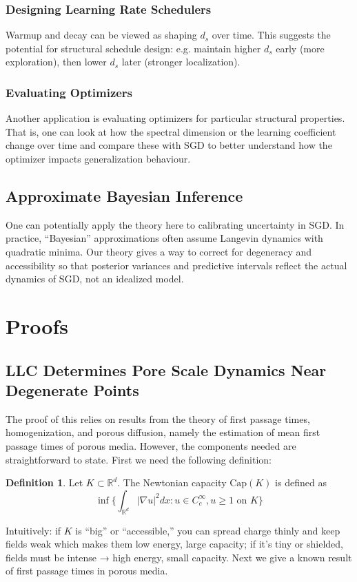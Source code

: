 \documentclass{article} %
\theoremstyle{definition}
\newtheorem{definition}{Definition}[section]
\begin{document}
\subsubsection{Designing Learning Rate Schedulers}
Warmup and decay can be viewed as shaping $d_s$ over time. This suggests the potential for structural schedule design: e.g. maintain higher $d_s$ early (more exploration), then lower $d_s$ later (stronger localization).

\subsubsection{Evaluating Optimizers}
Another application is evaluating optimizers for particular structural properties. That is, one can look at how the spectral dimension or the learning coefficient change over time and compare these with SGD to better understand how the optimizer impacts generalization behaviour.

\subsection{Approximate Bayesian Inference}
One can potentially apply the theory here to calibrating uncertainty in SGD. In practice, “Bayesian” approximations often assume Langevin dynamics with quadratic minima. Our theory gives a way to correct for degeneracy and accessibility so that posterior variances and predictive intervals reflect the actual dynamics of SGD, not an idealized model.


\section{Proofs}\label{app:proofs}
\subsection{LLC Determines Pore Scale Dynamics Near Degenerate Points}
The proof of this relies on results from the theory of first passage times, homogenization, and porous diffusion, namely the estimation of mean first passage times of porous media. However, the components needed are straightforward to state. First we need the following definition\citep{potential_theory}:
\begin{definition}
Let $K \subset \mathbb{R}^d$. The Newtonian capacity $\text{Cap}(K)$ is defined as
\begin{equation}
    \inf \{ \int_{\mathbb{R}^d} |\nabla u|^2 dx : u \in C_c^\infty, u \geq 1 \text{ on } K \}
\end{equation}
\end{definition}
Intuitively: if $K$ is “big” or “accessible,” you can spread charge thinly and keep fields weak which makes them low energy, large capacity; if it’s tiny or shielded, fields must be intense → high energy, small capacity. Next we give a known result of first passage times in porous media\citep{Redner_2001}.
\end{document}
